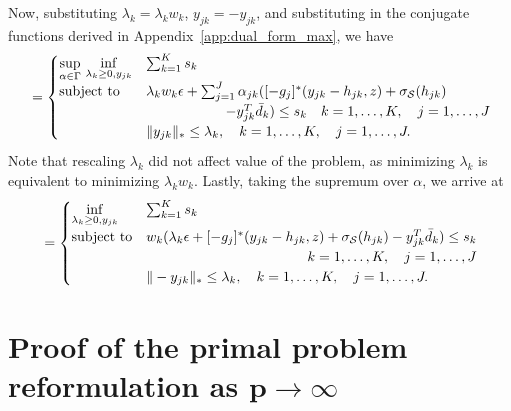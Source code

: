{%
Now, substituting $\lambda_k = \lambda_k w_k$, $y_{jk} = -y_{jk}$, and substituting in the conjugate functions derived in Appendix~\ref{app:dual_form_max}, we have 
\begin{equation*}
\begin{aligned}
&= \begin{cases}
	\underset{\alpha \in \Gamma}{\sup}~\underset{\lambda_k \geq 0, y_{jk}}{\inf} &  \sum_{k=1} ^K s_k \\
	\mbox{subject to} &  \lambda_k w_k\epsilon + \sum_{j=1}^J \alpha_{jk} ([-g_j]^*(y_{jk} - h_{jk},z) + \sigma_{\mathcal{S}}(h_{jk}) \\
	&\hspace{2cm} - y_{jk}^T\bar{d}_k) \le s_k \quad k = 1,\dots,K, \quad j = 1,\dots,J\\
	& \|y_{jk}\|_*\leq \lambda_k,\quad k = 1,\dots,K, \quad j = 1,\dots,J.
\end{cases}\\
\end{aligned}
\end{equation*}
Note that rescaling $\lambda_k$ did not affect value of the problem, as minimizing $\lambda_k$ is equivalent to minimizing $\lambda_k w_k$.
Lastly, taking the supremum over $\alpha$, we arrive at
\begin{equation*}
	\begin{aligned}
	&= \begin{cases}
		\underset{\lambda_k \geq 0, y_{jk}}{\inf} &  \sum_{k=1} ^K s_k \\
		\mbox{subject to} & w_k(\lambda_k\epsilon + [-g_j]^*(y_{jk} - h_{jk},z) + \sigma_{\supp}(h_{jk})  - y_{jk}^T\bar{d}_k) \le s_k\\
		&\hfill  \quad k = 1,\dots,K, \quad j = 1,\dots,J\\
		& \|-y_{jk}\|_*\leq \lambda_k,\quad k = 1,\dots,K, \quad j = 1,\dots,J.
	\end{cases}\\
	\end{aligned}
	\end{equation*}
}



\section{Proof of the primal problem reformulation as $\mathbf{p \rightarrow \infty}$}
\label{app:primal_limit}


